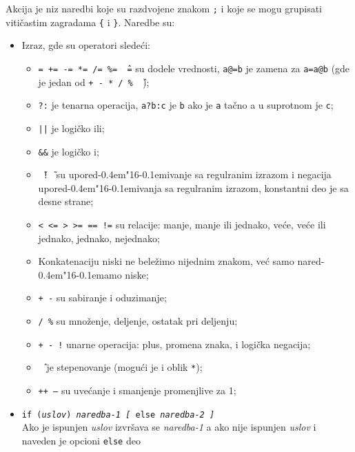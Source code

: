 \documentclass[12pt,a4paper]{article}
\def\d{d\kern-0.4em\char"16\kern-0.1em}
\begin{document}
        Akcija je niz naredbi koje su razdvojene znakom {\tt;} i koje se mogu
        grupisati viti\v castim zagradama {\tt\{} i {\tt\}}.
        Naredbe su:
        \begin{itemize}
        \item
          Izraz, gde su operatori slede\'ci:
          \begin{itemize}
          \item
            {\tt= += -= *= /= \%= \^\ =} su dodele vrednosti, {\tt a@=b} je
            zamena za {\tt a=a@b} (gde je {\tt@} jedan od
            {\tt+ - * / \% \^\ });
          \item
            {\tt?:} je tenarna operacija, {\tt a?b:c} je {\tt b} ako je
            {\tt a} ta\v cno a u suprotnom je {\tt c};
          \item
            {\tt||} je logi\v cko ili;
          \item
            {\tt\&\&} je logi\v cko i;
          \item
            {\tt\~\  !\~\ } su upore\d ivanje sa regulranim izrazom i
            negacija upore\d i\-vanja sa regulranim izrazom, konstantni deo
            je sa desne strane;
          \item
            {\tt< <= > >= == !=} su relacije: manje, manje ili jednako,
            ve\'ce, ve\'ce ili jednako, jednako, nejednako;
          \item
            Konkatenaciju niski ne bele\v zimo nijednim znakom, ve\'c samo
            nare\-\d amo niske;
          \item
            {\tt+ -} su sabiranje i oduzimanje;
          \item
            {\tt * / \%} su mno\v zenje, deljenje, ostatak pri deljenju;
          \item
            {\tt + - !} unarne operacija: plus, promena znaka, i logi\v cka
            negacija;
          \item
            {\tt\^\ } je stepenovanje (mogu\'ci je i oblik {\tt**});
          \item
            {\tt++ --} su uve\'canje i smanjenje promenjlive za 1;
          \end{itemize}
        \item
          {\tt if ({\it uslov}) {\it naredba-1} {\it[} else
          {\it naredba-2 ]}}\\
          Ako je ispunjen {\it uslov} izvr\v sava se {\it naredba-1} a ako
          nije ispunjen {\it uslov} i naveden je opcioni {\tt else} deo

\end{itemize}
\end{document}
